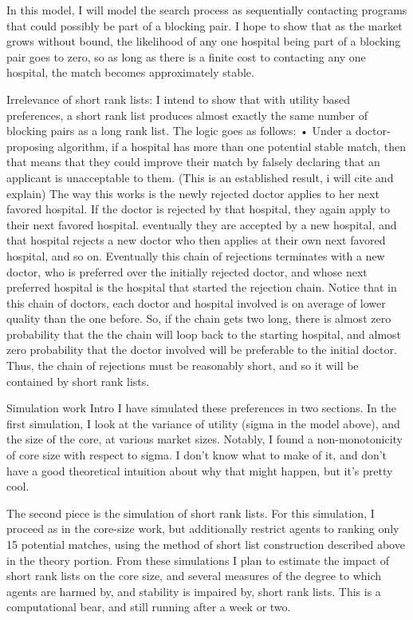 \documentclass[WP]{AEA}
\begin{document}
In this model, I will model the search process as sequentially contacting programs that could possibly be part of a blocking pair.  I hope to show that as the market grows without bound, the likelihood of any one hospital being part of a blocking pair goes to zero, so as long as there is a finite cost to contacting any one hospital, the match becomes approximately stable.

Irrelevance of short rank lists:
I intend to show that with utility based preferences, a short rank list produces almost exactly the same number of blocking pairs as a long rank list.  The logic goes as follows:
•	Under a doctor-proposing algorithm, if a hospital has more than one potential stable match, then that means that they could improve their match by falsely declaring that an applicant is unacceptable to them. (This is an established result, i will cite and explain)
The way this works is the newly rejected doctor applies to her next favored hospital.  If the doctor is rejected by that hospital, they again apply to their next favored hospital.  eventually they are accepted by a new hospital, and that hospital rejects a new doctor who then applies at their own next favored hospital, and so on.  Eventually this chain of rejections terminates with a new doctor, who is preferred over the initially rejected doctor, and whose next preferred hospital is the hospital that started the rejection chain.  
Notice that in this chain of doctors, each doctor and hospital involved is on average of lower quality than the one before. So, if the chain gets two long, there is almost zero probability that the the chain will loop back to the starting hospital, and almost zero probability that the doctor involved will be preferable to the initial doctor.
Thus, the chain of rejections must be reasonably short, and so it will be contained by short rank lists.

Simulation work
Intro
I have simulated these preferences in two sections.  In the first simulation, I look at the variance of utility (sigma in the model above), and the size of the core, at various market sizes.  Notably, I found a non-monotonicity of core size with respect to sigma.  I don’t know what to make of it, and don’t have a good theoretical intuition about why that might happen, but it’s pretty cool.

The second piece is the simulation of short rank lists.  For this simulation, I proceed as in the core-size work, but additionally restrict agents to ranking only 15 potential matches, using the method of short list construction described above in the theory portion.  From these simulations I plan to estimate the impact of short rank lists on the core size, and several measures of the degree to which agents are harmed by, and stability is impaired by, short rank lists.  This is a computational bear, and still running after a week or two.
\end{document}
